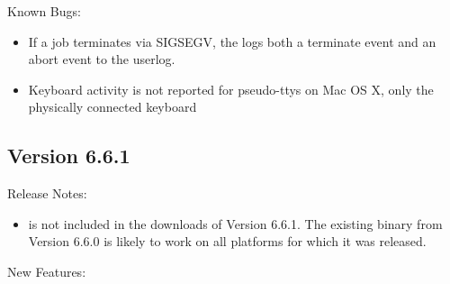 \noindent Known Bugs:

\begin{itemize}

\item If a job terminates via SIGSEGV, the  logs both a
      terminate event and an abort event to the userlog.

\item Keyboard activity is not reported for pseudo-ttys on Mac OS X, only
      the physically connected keyboard

\end{itemize}


\subsection{\label{sec:New-6-6-1}Version 6.6.1}

\noindent Release Notes:

\begin{itemize}

\item {} is not included in the downloads of Version 6.6.1.
  The existing binary from Version 6.6.0 is likely to work on all platforms
  for which it was released.

\end{itemize}


\noindent New Features:

